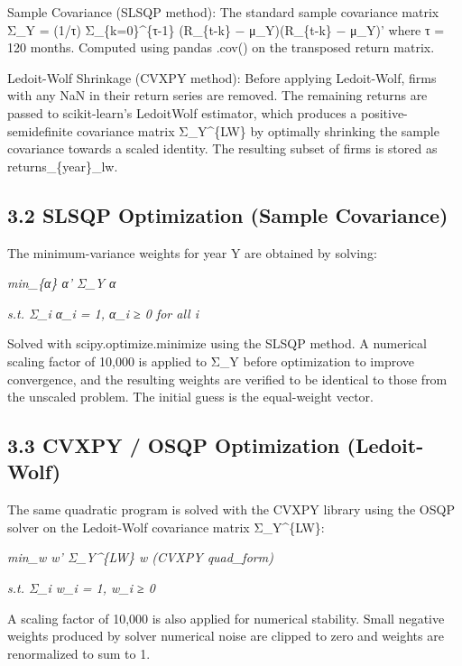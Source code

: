 \documentclass[
  11pt,
]{article}
\begin{document}
Sample Covariance (SLSQP method): The standard sample covariance matrix
Σ\_Y = (1/τ) Σ\_\{k=0\}\^{}\{τ-1\} (R\_\{t-k\} − μ\_Y)(R\_\{t-k\} −
μ\_Y)' where τ = 120 months. Computed using pandas .cov() on the
transposed return matrix.

Ledoit-Wolf Shrinkage (CVXPY method): Before applying Ledoit-Wolf, firms
with any NaN in their return series are removed. The remaining returns
are passed to scikit-learn's LedoitWolf estimator, which produces a
positive-semidefinite covariance matrix Σ\_Y\^{}\{LW\} by optimally
shrinking the sample covariance towards a scaled identity. The resulting
subset of firms is stored as returns\_\{year\}\_lw.

\hypertarget{slsqp-optimization-sample-covariance}{%
\subsection{3.2 SLSQP Optimization (Sample
Covariance)}\label{slsqp-optimization-sample-covariance}}

The minimum-variance weights for year Y are obtained by solving:

\emph{min\_\{α\} α' Σ\_Y α}

\emph{s.t. Σ\_i α\_i = 1, α\_i ≥ 0 for all i}

Solved with scipy.optimize.minimize using the SLSQP method. A numerical
scaling factor of 10,000 is applied to Σ\_Y before optimization to
improve convergence, and the resulting weights are verified to be
identical to those from the unscaled problem. The initial guess is the
equal-weight vector.

\hypertarget{cvxpy-osqp-optimization-ledoit-wolf}{%
\subsection{3.3 CVXPY / OSQP Optimization
(Ledoit-Wolf)}\label{cvxpy-osqp-optimization-ledoit-wolf}}

The same quadratic program is solved with the CVXPY library using the
OSQP solver on the Ledoit-Wolf covariance matrix Σ\_Y\^{}\{LW\}:

\emph{min\_w w' Σ\_Y\^{}\{LW\} w (CVXPY quad\_form)}

\emph{s.t. Σ\_i w\_i = 1, w\_i ≥ 0}

A scaling factor of 10,000 is also applied for numerical stability.
Small negative weights produced by solver numerical noise are clipped to
zero and weights are renormalized to sum to 1.
\end{document}

